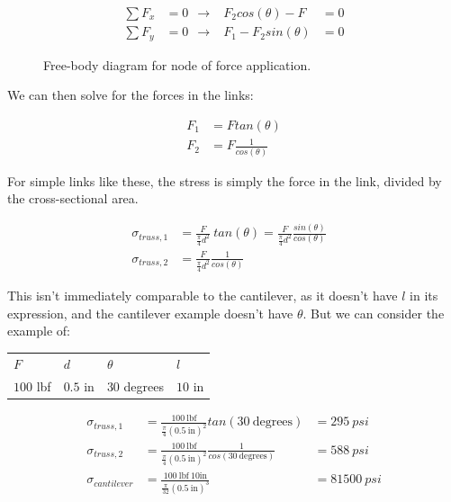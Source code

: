 \begin{figure}[H]
\begin{subfigure}[b]{.4\linewidth}
\end{subfigure}\begin{subfigure}[b]{.5\linewidth}
\begin{align}
	\sum F_x &= 0 \ \ \rightarrow & F_2 cos(\theta) - F &= 0 \\
	\sum F_y &= 0 \ \ \rightarrow & F_1 - F_2 sin(\theta) &= 0
\end{align}
\end{subfigure}
\caption{Free-body diagram for node of force application.}
\end{figure}

We can then solve for the forces in the links:

\begin{align}
	F_1 &= F tan(\theta) \\
	F_2 &= F \frac{1}{cos(\theta)}
\end{align}

For simple links like these, the stress is simply the force in the link, divided by the cross-sectional area.

\begin{align}
	\sigma_{truss, 1} &= \frac{F}{\frac{\pi}{4} d^2} \ tan (\theta) = \frac{F}{\frac{\pi}{4} d^2} \frac{sin(\theta)}{cos(\theta)} \\
	\sigma_{truss, 2} &= \frac{F}{\frac{\pi}{4} d^2} \frac{1}{cos(\theta)} & 
\end{align}

This isn't immediately comparable to the cantilever, as it doesn't have $l$ in its expression, and the cantilever example doesn't have $\theta$. But we can consider the example of:

\begin{table}[]
\begin{tabular}{llll}
$F$       & $d$      & $\theta$      & $l$     \\
$100$ lbf & $0.5$ in & $30$ degrees & $10$ in
\end{tabular}
\end{table}

\begin{align}
	\sigma_{truss, 1} &= \frac{100 \ \mbox{lbf}}{\frac{\pi}{4} (0.5 \ \mbox{in})^2 } tan(30 \ \mbox{degrees}) &= 295 \ psi\\
	\sigma_{truss, 2} &= \frac{100 \ \mbox{lbf}}{\frac{\pi}{4} (0.5 \ \mbox{in})^2 } \frac{1}{cos(30 \ \mbox{degrees})} &= 588 \ psi \\
	\sigma_{cantilever} &= \frac{100 \ \mbox{lbf} \ 10 \mbox{in}}{\frac{\pi}{32} (0.5 \ \mbox{in})^3} &= 81500 \ psi
\end{align}

